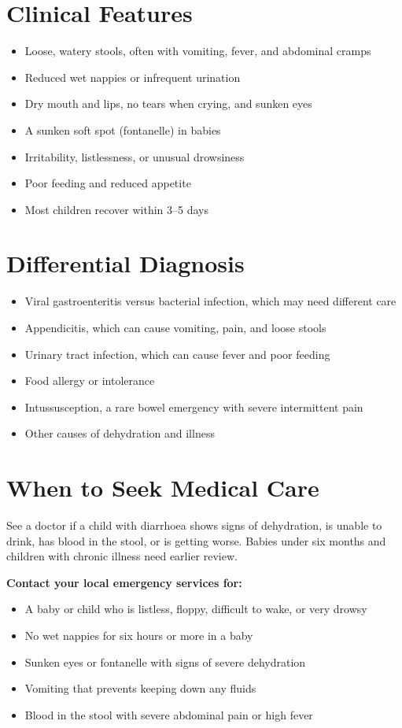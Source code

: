 \section*{Clinical Features}
\begin{itemize}
    \item Loose, watery stools, often with vomiting, fever, and abdominal cramps
    \item Reduced wet nappies or infrequent urination
    \item Dry mouth and lips, no tears when crying, and sunken eyes
    \item A sunken soft spot (fontanelle) in babies
    \item Irritability, listlessness, or unusual drowsiness
    \item Poor feeding and reduced appetite
    \item Most children recover within 3--5 days
\end{itemize}

\section*{Differential Diagnosis}
\begin{itemize}
    \item Viral gastroenteritis versus bacterial infection, which may need different care
    \item Appendicitis, which can cause vomiting, pain, and loose stools
    \item Urinary tract infection, which can cause fever and poor feeding
    \item Food allergy or intolerance
    \item Intussusception, a rare bowel emergency with severe intermittent pain
    \item Other causes of dehydration and illness
\end{itemize}

\section*{When to Seek Medical Care}
See a doctor if a child with diarrhoea shows signs of dehydration, is unable to drink, has blood in the stool, or is getting worse. Babies under six months and children with chronic illness need earlier review.

\textbf{Contact your local emergency services for:}
\begin{itemize}
    \item A baby or child who is listless, floppy, difficult to wake, or very drowsy
    \item No wet nappies for six hours or more in a baby
    \item Sunken eyes or fontanelle with signs of severe dehydration
    \item Vomiting that prevents keeping down any fluids
    \item Blood in the stool with severe abdominal pain or high fever
\end{itemize}

